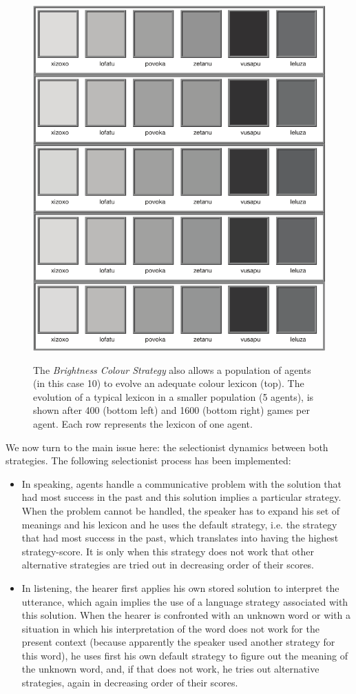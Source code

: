 \begin{figure}[p]
{\includegraphics[height=0.5\textwidth]{chap12/figs/bw-4000.pdf}}
\label{fig:brightness-dynamics}
\caption{{The {\itshape Brightness Colour Strategy} also allows a population of agents (in this case 10)
to evolve an adequate colour lexicon (top). The evolution of a typical lexicon in a smaller population (5 agents), is shown 
after 400 (bottom left) and 1600 (bottom right) games per agent. Each row represents
the lexicon of one agent.}}
\end{figure}

We now turn to the main issue here: the
selectionist dynamics between both strategies. The following selectionist process has been implemented: 
\begin{itemize}
\item In speaking, agents handle a communicative problem with the solution 
that had most success in the past and this solution implies a particular strategy. 
When the problem cannot be handled, the speaker 
has to expand his set of meanings and his lexicon and he uses the default strategy, 
i.e. the strategy that had most success in the past, which translates into having the highest
strategy-score. It is only when this strategy does not work that 
other alternative strategies are tried out in decreasing order of their scores. 
\item In listening, the hearer first applies his own 
stored solution to interpret the utterance, which again implies the use of a language strategy associated
with this solution. When the hearer is confronted with an unknown word or with a situation in which 
his interpretation of the word does not work for the present context (because apparently the speaker 
used another strategy for this word), he uses first his own default 
strategy to figure out the meaning of the unknown word, and, if that does not work, he tries out alternative
strategies, again in decreasing order of their scores. 
\end{itemize}


